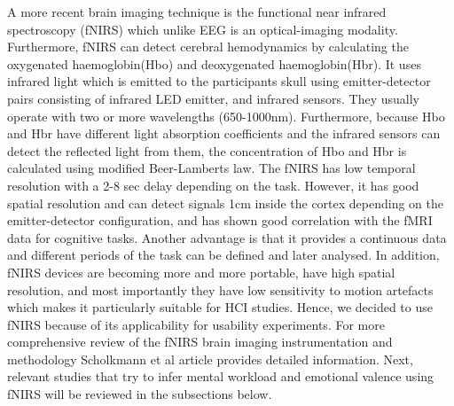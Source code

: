 \documentclass[a4paper]{report}
\begin{document}
	A more recent brain imaging technique is the functional near infrared spectroscopy (fNIRS) which unlike EEG is an optical-imaging modality. Furthermore, fNIRS can detect cerebral hemodynamics by calculating the oxygenated haemoglobin(Hbo) and deoxygenated haemoglobin(Hbr). It uses infrared light which is emitted to the participants skull using emitter-detector pairs consisting of infrared LED emitter, and infrared sensors. They usually operate with two or more wavelengths (650-1000nm)\cite{scholkmann2014review}. Furthermore, because Hbo and Hbr have different light absorption coefficients and the infrared sensors can detect the reflected light from them, the concentration of Hbo and Hbr is calculated using modified Beer-Lamberts law\cite{delpy1988estimation}. The fNIRS has low temporal resolution with a 2-8 sec delay\cite{huppert2006temporal,solovey2009using} depending on the task. However, it has good spatial resolution and can detect signals 1cm inside the cortex depending on the emitter-detector configuration, and has shown good correlation with the fMRI data\cite{cui2011quantitative} for cognitive tasks.  Another advantage is that it provides a continuous data and different periods of the task can be defined and later analysed. In addition, fNIRS devices are becoming more and more portable, have high spatial resolution, and most importantly they have low sensitivity to motion artefacts which makes it particularly suitable for HCI studies\cite{maior2015examining,solovey2009using}. Hence, we decided to use fNIRS because of its applicability for usability experiments. For more comprehensive review of the fNIRS brain imaging instrumentation and methodology Scholkmann et al\cite{scholkmann2014review} article provides detailed information.
	Next, relevant studies that try to infer mental workload and emotional valence using fNIRS will be reviewed in the subsections below.
\end{document}
